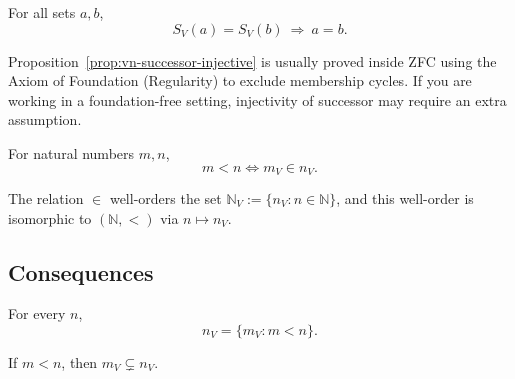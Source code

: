 \begin{proposition}
\label{prop:vn-successor-injective}
For all sets $a,b$,
\[
S_V(a)=S_V(b)\ \Rightarrow\ a=b.
\]
\end{proposition}



\begin{remark}
Proposition~\ref{prop:vn-successor-injective} is usually proved inside ZFC using the
Axiom of Foundation (Regularity) to exclude membership cycles.
If you are working in a foundation-free setting, injectivity of successor may require an extra assumption.
\end{remark}

\begin{proposition}
\label{prop:vn-order-by-membership}
For natural numbers $m,n$,
\[
m<n \iff m_V \in n_V.
\]
\end{proposition}



\begin{proposition}
\label{prop:vn-well-ordered}
The relation $\in$ well-orders the set $\mathbb{N}_V := \{n_V : n\in\mathbb{N}\}$,
and this well-order is isomorphic to $(\mathbb{N},<)$ via $n\mapsto n_V$.
\end{proposition}



\subsection{Consequences}

\begin{corollary}
\label{cor:vn-predecessors}
For every $n$,
\[
n_V = \{m_V : m<n\}.
\]
\end{corollary}



\begin{corollary}
\label{cor:vn-monotone}
If $m<n$, then $m_V \subsetneq n_V$.
\end{corollary}


